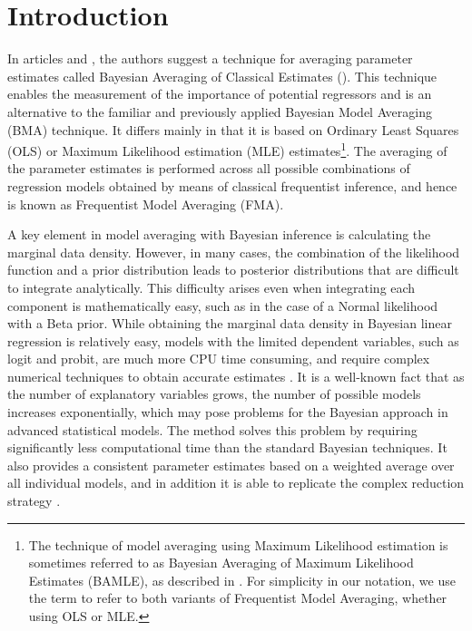 \section{Introduction}
In articles \cite{Raftery1995} and \cite{SalaMartinDoppelhoferMiller_BACE},
the authors suggest a technique for averaging parameter
estimates called Bayesian Averaging of Classical Estimates
(). This technique enables the measurement of the
importance of potential regressors and is an alternative to
the familiar and previously applied Bayesian Model Averaging
(BMA) technique. It differs mainly in that it is based on
Ordinary Least Squares (OLS) or Maximum Likelihood estimation
(MLE) estimates\footnote{The technique of model averaging using
	Maximum Likelihood estimation is sometimes referred to as
	Bayesian Averaging of Maximum Likelihood Estimates (BAMLE),
	as described in \cite{Moral_Benito_2012}. For simplicity in
	our notation, we use the term  to refer to both
	variants of Frequentist Model Averaging, whether using OLS or MLE.}.
The averaging of the parameter estimates is performed across
all possible combinations of regression models obtained by means
of classical frequentist inference, and hence is known as
Frequentist Model Averaging (FMA).

A key element in model averaging with Bayesian inference is
calculating the marginal data density. However, in many cases,
the combination of the likelihood function and a prior distribution
leads to posterior distributions that are difficult to integrate
analytically. This difficulty arises even when integrating each
component is mathematically easy, such as in the case of a Normal
likelihood with a Beta prior. While obtaining the marginal data
density in Bayesian linear regression is relatively easy, models with
the limited dependent variables, such as logit and
probit, are much more 
CPU time consuming,  and require complex  numerical techniques
to obtain accurate estimates \cite[see][]{Bollen_2014,Pajor2017,JSSv104i02}.
It is a well-known fact that as the number of explanatory variables grows,
 the number of possible models increases exponentially, which may 
 pose problems for the Bayesian approach in advanced statistical models. The  method
solves this problem by requiring
significantly less computational time than the standard Bayesian
techniques.
It also provides a consistent %
parameter estimates based on a weighted average over all
 individual models, and in addition it is  able  to replicate 
the complex reduction strategy \citep{Kufel_jae_2020}.

